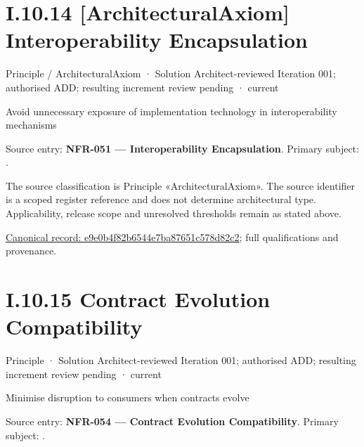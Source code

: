\section*{I.10.14 [ArchitecturalAxiom] Interoperability Encapsulation}
\label{navigation:I.10.14}

\label{element:e9e0b4f82b6544e7ba87651c578d82c2}
{\small Principle / ArchitecturalAxiom · Solution Architect-reviewed Iteration 001; authorised ADD; resulting increment review pending · current}\par

Avoid unnecessary exposure of implementation technology in interoperability mechanisms



Source entry: \textbf{NFR-051 — Interoperability Encapsulation}. Primary subject: \texttt{}.



The source classification is Principle «ArchitecturalAxiom». The source identifier is a scoped register reference and does not determine architectural type. Applicability, release scope and unresolved thresholds remain as stated above.


{\footnotesize \href{../../../../../../../continuum/motivation/principle/architectural-axiom/e9e0b4f82b6544e7ba87651c578d82c2.md}{Canonical record: e9e0b4f82b6544e7ba87651c578d82c2}; full qualifications and provenance.}\par
\section*{I.10.15 Contract Evolution Compatibility}
\label{navigation:I.10.15}

\label{element:0da415a142c640d9ab1c73d770df8ea3}
{\small Principle · Solution Architect-reviewed Iteration 001; authorised ADD; resulting increment review pending · current}\par

Minimise disruption to consumers when contracts evolve



Source entry: \textbf{NFR-054 — Contract Evolution Compatibility}. Primary subject: \texttt{}.



